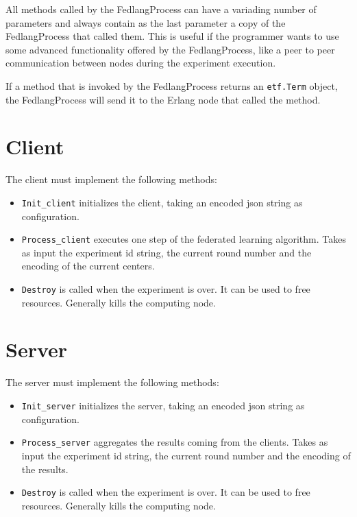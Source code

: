 All methods called by the FedlangProcess can have a variading number of parameters and always contain as the last parameter a copy of the FedlangProcess that called them. This is useful if the programmer wants to use some advanced functionality offered by the FedlangProcess, like a peer to peer communication between nodes during the experiment execution.

If a method that is invoked by the FedlangProcess returns an \texttt{etf.Term} object, the FedlangProcess will send it to the Erlang node that called the method.

\section{Client}
The client must implement the following methods:
\begin{itemize}
	\item \texttt{Init\_client} initializes the client, taking an encoded json string as configuration.
	\item \texttt{Process\_client} executes one step of the federated learning algorithm. Takes as input the experiment id string, the current round number and the encoding of the current centers.
	\item \texttt{Destroy} is called when the experiment is over. It can be used to free resources. Generally kills the computing node.
\end{itemize}

\section{Server}
The server must implement the following methods:
\begin{itemize}
	\item \texttt{Init\_server} initializes the server, taking an encoded json string as configuration.
	\item \texttt{Process\_server} aggregates the results coming from the clients. Takes as input the experiment id string, the current round number and the encoding of the results.
	\item \texttt{Destroy} is called when the experiment is over. It can be used to free resources. Generally kills the computing node.
\end{itemize}

